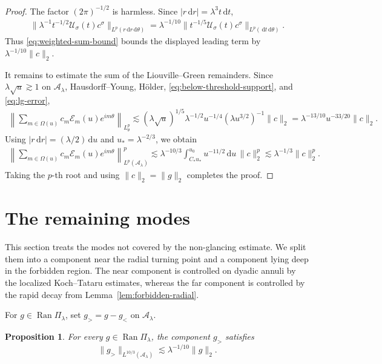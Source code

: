 \documentclass[11pt,a4paper]{amsart}
\newtheorem{proposition}[theorem]{Proposition}
\numberwithin{equation}{section}
\newcommand{\dd}{\,\mathrm d}
\newcommand{\norm}[1]{\lVert #1\rVert}
\begin{document}
\begin{proof}
The factor \((2\pi)^{-1/2}\) is harmless. Since
\(|r\dd r|=\lambda^3t\dd t\),
\[
 \begin{aligned}
 \norm{\lambda^{-1}t^{-1/2}
 \mathcal U_\sigma(t)c^\sigma}_{L^p(r\dd r\dd\theta)}=\lambda^{-1/10}
 \norm{t^{-1/5}\mathcal U_\sigma(t)c^\sigma}_{L^p(\dd t\dd\theta)}.
 \end{aligned}
\]
Thus \eqref{eq:weighted-sum-bound} bounds the displayed leading term by
\(\lambda^{-1/10}\norm c_2\).

It remains to estimate the sum of the Liouville--Green remainders. Since
\(\lambda\sqrt u\gtrsim1\) on \(\mathcal A_\lambda\), Hausdorff--Young,
H\"older, \eqref{eq:below-threshold-support}, and
\eqref{eq:lg-error},
\[
 \begin{aligned}
 \left\|
 \sum_{m\in\Omega(u)}c_m\mathcal E_m(u)e^{im\theta}
 \right\|_{L_\theta^p}\lesssim
 (\lambda\sqrt u)^{1/5}
 \lambda^{-1/2}u^{-1/4}(\lambda u^{3/2})^{-1}\norm c_2
 =\lambda^{-13/10}u^{-33/20}\norm c_2.
 \end{aligned}
\]
Using \(|r\dd r|=(\lambda/2)\dd u\) and \(u_*=\lambda^{-2/3}\), we obtain
\[
 \begin{aligned}
 \left\|
 \sum_{m\in\Omega(u)}c_m\mathcal E_m(u)e^{im\theta}
 \right\|_{L^p(\mathcal A_\lambda)}^p
\lesssim
 \lambda^{-10/3}\int_{C_*u_*}^{u_0}u^{-11/2}\dd u\,\norm c_2^p
 \lesssim\lambda^{-1/3}\norm c_2^p.
 \end{aligned}
\]
Taking the \(p\)-th root and using \(\norm c_2=\norm g_2\) completes the
proof.
\end{proof}

\section{The remaining  modes}\label{sec:complementary}

This section treats the modes not covered by the non-glancing estimate. We
split them into a component near the radial turning point and a component lying
deep in the forbidden region. The near component is controlled on dyadic
annuli by the localized Koch--Tataru estimates, whereas the far component is controlled by the rapid decay from
Lemma~\ref{lem:forbidden-radial}. 

For \(g\in\operatorname{Ran}\Pi_\lambda\), set
$
 g_{>}=g-g_{<}$ on $\mathcal A_\lambda.$
\begin{proposition}\label{prop:complementary}
For every \(g\in\operatorname{Ran}\Pi_\lambda\), the component \(g_>\)
satisfies
\[
 \norm{g_{>}}_{L^{10/3}(\mathcal A_\lambda)}
 \lesssim\lambda^{-1/10}\norm g_2.
\]
\end{proposition}
\end{document}
